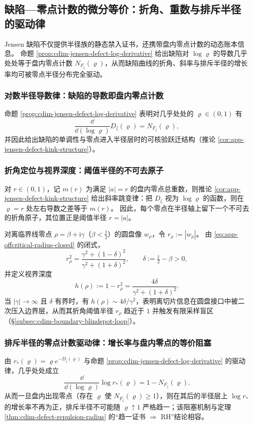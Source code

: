\subsection{缺陷—零点计数的微分等价：折角、重数与排斥半径的驱动律}\label{subsec:cdim-defect-zero-count-differential-equivalence}
Jensen 缺陷不仅提供半径族的静态禁入证书，还携带盘内零点计数的动态账本信息。
命题 \ref{prop:cdim-jensen-defect-log-derivative} 给出缺陷对 \(\log\varrho\) 的导数几乎处处等于盘内零点计数 \(N_{F_{\zeta}}(\varrho)\)，从而缺陷曲线的折角、斜率与排斥半径的增长率均可被零点半径分布完全驱动。

\subsubsection{对数半径导数律：缺陷的导数即盘内零点计数}
命题 \ref{prop:cdim-jensen-defect-log-derivative} 表明对几乎处处的 \(\varrho\in(0,1)\) 有
\[
\frac{\dd}{\dd(\log\varrho)}D_{\zeta}(\varrho)=N_{F_{\zeta}}(\varrho),
\]
并因此给出缺陷的单调性与零点进入半径层时的可核验跃迁结构（推论 \ref{cor:app-jensen-defect-kink-structure}）。

\subsubsection{折角定位与视界深度：阈值半径的不可去原子}
对 \(r\in(0,1)\)，记 \(m(r)\) 为满足 \(|a|=r\) 的盘内零点总重数，则推论 \ref{cor:app-jensen-defect-kink-structure} 给出斜率跳变律：把 \(D_{\zeta}\) 视为 \(\log\varrho\) 的函数，则在 \(\varrho=r\) 处左右导数之差等于 \(m(r)\)。
因此，每个零点在半径轴上留下一个不可去的折角原子，其位置正是阈值半径 \(r=|a|\)。
\par
对离临界线零点 \(\rho=\beta+\mathrm{i}\gamma\)（\(\beta<\tfrac12\)）的圆盘像 \(w_{\rho}\)，令 \(r_{\rho}:=|w_{\rho}|\)。
由 \eqref{eq:app-offcritical-radius-closed} 的闭式，
\[
r_{\rho}^{2}=\frac{\gamma^{2}+(1-\delta)^{2}}{\gamma^{2}+(1+\delta)^{2}},
\qquad
\delta:=\tfrac12-\beta>0,
\]
并定义视界深度
\[
h(\rho):=1-r_{\rho}^{2}=\frac{4\delta}{\gamma^{2}+(1+\delta)^{2}}.
\]
当 \(|\gamma|\to\infty\) 且 \(\delta\) 有界时，有 \(h(\rho)\sim 4\delta/\gamma^{2}\)，表明离切片信息在圆盘接口中被二次压入边界层，从而其折角阈值半径 \(r_{\rho}\) 趋近于 \(1\) 并触发有限采样盲区（\S\ref{subsec:cdim-boundary-blindspot-loop}）。

\subsubsection{排斥半径的零点计数驱动律：增长率与盘内零点的等价阻塞}
由 \(r_{\ast}(\varrho)=\varrho e^{-D_{\zeta}(\varrho)}\) 与命题 \ref{prop:cdim-jensen-defect-log-derivative} 的驱动律，几乎处处成立
\[
\frac{\dd}{\dd(\log\varrho)}\log r_{\ast}(\varrho)=1-N_{F_{\zeta}}(\varrho).
\]
从而一旦盘内出现零点（存在 \(\varrho\) 使 \(N_{F_{\zeta}}(\varrho)\ge 1\)），则在其后的半径层上 \(\log r_{\ast}\) 的增长率不再为正，排斥半径不可能随 \(\varrho\uparrow 1\) 严格趋一；该阻塞机制与定理 \ref{thm:cdim-defect-repulsion-radius} 的“趋一证书 \(\Rightarrow\) RH”结论相容。

